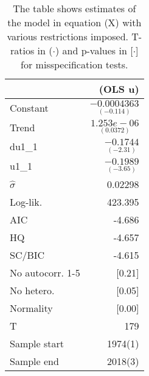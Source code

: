
\begin{table}[tbph]
\begin{center}
\begin{tabular}{lr}
\hline
& (OLS u) \\
\hline
Constant & $\underset{(-0.114)}{-0.0004363}$ \\
Trend & $\underset{(0.0372)}{1.253e-06}$ \\
du1\_1 & $\underset{(-2.31)}{-0.1744}$ \\
u1\_1 & $\underset{(-3.65)}{-0.1989}$ \\
\hline
$\hat{\sigma}$ & 0.02298 \\
Log-lik. & 423.395 \\
\hline
AIC & -4.686 \\
HQ & -4.657 \\
SC/BIC & -4.615 \\
\hline
No autocorr. 1-5 & [0.21] \\
No hetero. & [0.05] \\
Normality & [0.00] \\
\hline
T & 179 \\
Sample start & 1974(1) \\
Sample end & 2018(3) \\
\hline
\end{tabular}
\end{center}
\vspace{1em}
\caption{The table shows estimates of the model in equation (X) with various restrictions imposed. T-ratios in ($\cdot$) and p-values in [$\cdot$] for misspecification tests.}
\end{table}
